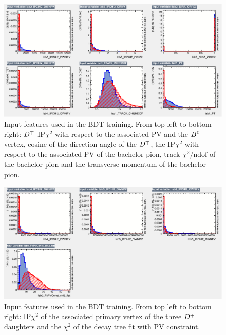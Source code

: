\begin{figure}[t]
  \begin{center}
    \includegraphics[width=\textwidth]{AA-Appdx-selection/figs/variables_id_c2.pdf}
  \end{center}
  \vspace{-2mm}
  \caption{Input features used in the BDT training. From top left to bottom right: $D^\mp$ $\text{IP}\chi^2$ with respect to the associated
  		PV and the $B^0$ vertex, cosine of the direction angle of the $D^\mp$, the $\text{IP}\chi^2$ with respect to the associated PV of the
  		bachelor pion, track $\chi^2/\text{ndof}$ of the bachelor pion and the transverse momentum of the bachelor pion.}
  \label{fig:BDTinput2}
\end{figure}
\begin{figure}[t]
  \begin{center}
    \includegraphics[width=\textwidth]{AA-Appdx-selection/figs/variables_id_c3.pdf}
  \end{center}
  \vspace{-2mm}
  \caption{Input features used in the BDT training. From top left to bottom right: $\text{IP}\chi^2$ of the associated primary
  		vertex of the three $D^\mp$ daughters and the $\chi^2$ of the decay tree fit with PV constraint.}
  \label{fig:BDTinput3}
\end{figure}

